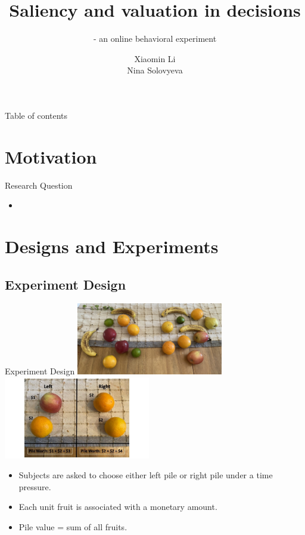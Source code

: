 \documentclass[UKenglish, aspectratio = 169]{beamer}
\author
{Xiaomin Li \texorpdfstring{\\}{} Nina Solovyeva}
\title{Saliency and valuation in decisions}
\subtitle{- an online behavioral experiment}
\begin{document}
%
%
\begin{frame}{Table of contents}
    \tableofcontents
\end{frame}





\section{Motivation}
\begin{frame}{Research Question}
\begin{itemize}
	\item 
\end{itemize}
\end{frame}

\showlogo


\section{Designs and Experiments}
\subsection{Experiment Design}
\begin{frame}{Experiment Design}
	\center
    \includegraphics[width=0.48\textwidth]{images/img_2.jpg}
    \includegraphics[width=0.48\textwidth]{images/instruction1.jpg}
 \begin{itemize}
	\item Subjects are asked to choose either left pile or right pile under a time pressure.
	\item Each unit fruit is associated with a monetary amount.
	\item Pile value = sum of all fruits.
\end{itemize}
\end{frame}
\end{document}
